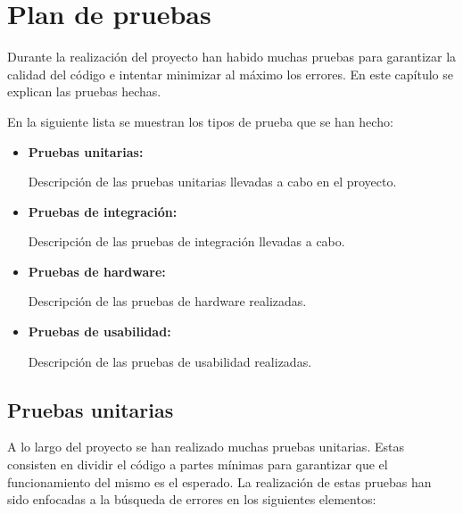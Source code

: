 \section{Plan de pruebas}

	Durante la realización del proyecto han habido muchas pruebas para garantizar la calidad del código e intentar minimizar al máximo los errores. En este capítulo se explican las pruebas hechas.

	En la siguiente lista se muestran los tipos de prueba que se han hecho:

	\begin{itemize}
		\item \textbf{Pruebas unitarias:}
			
		Descripción de las pruebas unitarias llevadas a cabo en el proyecto.

		\item \textbf{Pruebas de integración:}
			
		Descripción de las pruebas de integración llevadas a cabo.

		\item \textbf{Pruebas de hardware:}
			
		Descripción de las pruebas de hardware realizadas.

		\item \textbf{Pruebas de usabilidad:}
			
		Descripción de las pruebas de usabilidad realizadas.
	\end{itemize}

	\subsection{Pruebas unitarias}

		A lo largo del proyecto se han realizado muchas pruebas unitarias. Estas consisten en dividir el código a partes mínimas para garantizar que el funcionamiento del mismo es el esperado. La realización de estas pruebas han sido enfocadas a la búsqueda de errores en los siguientes elementos:

